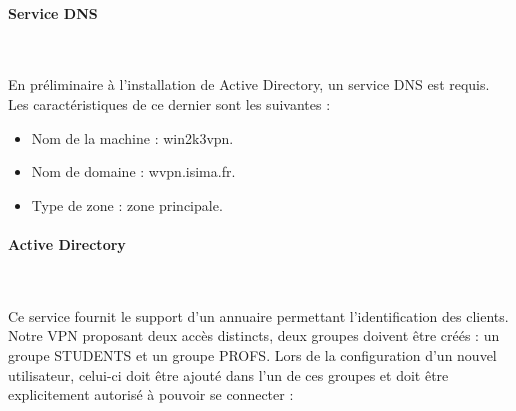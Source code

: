 


\paragraph{Service DNS}
~

En préliminaire à l'installation de Active Directory, un service DNS est requis. Les caractéristiques de ce dernier sont les suivantes :
\begin{itemize}
	\item Nom de la machine : win2k3vpn.
	\item Nom de domaine : wvpn.isima.fr.
	\item Type de zone : zone principale.
\end{itemize}


% 



\paragraph{Active Directory}
~

Ce service fournit le support d'un annuaire permettant l'identification des clients. Notre VPN proposant deux accès distincts, deux groupes doivent être créés : un groupe STUDENTS et un groupe PROFS. Lors de la configuration d'un nouvel utilisateur, celui-ci doit être ajouté dans l'un de ces groupes et doit être explicitement autorisé à pouvoir se connecter :

